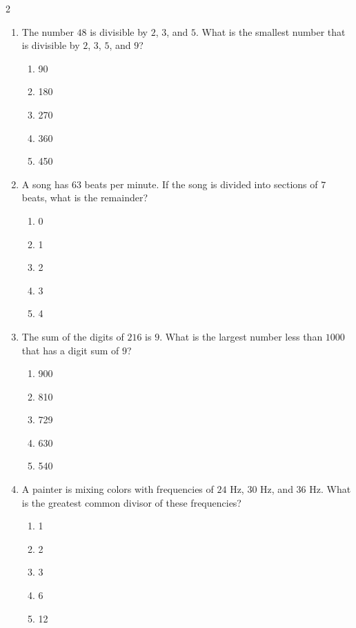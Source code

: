 \documentclass[10pt]{article}
\begin{document}
\begin{multicols}{2}
\begin{enumerate}[label=\textbf{Q\arabic*.}, leftmargin=*, itemsep=6pt, parsep=0pt]
  \item \small The number $48$ is divisible by $2$, $3$, and $5$. What is the smallest number that is divisible by $2$, $3$, $5$, and $9$?
  \begin{enumerate}[label=(\Alph*), leftmargin=0.6cm, nosep, itemsep=2pt]
    \item 90
    \item 180
    \item 270
    \item 360
    \item 450
  \end{enumerate}

  \item \small A song has $63$ beats per minute. If the song is divided into sections of $7$ beats, what is the remainder?
  \begin{enumerate}[label=(\Alph*), leftmargin=0.6cm, nosep, itemsep=2pt]
    \item 0
    \item 1
    \item 2
    \item 3
    \item 4
  \end{enumerate}

  \item \small The sum of the digits of $216$ is $9$. What is the largest number less than $1000$ that has a digit sum of $9$?
  \begin{enumerate}[label=(\Alph*), leftmargin=0.6cm, nosep, itemsep=2pt]
    \item 900
    \item 810
    \item 729
    \item 630
    \item 540
  \end{enumerate}

  \item \small A painter is mixing colors with frequencies of $24$ Hz, $30$ Hz, and $36$ Hz. What is the greatest common divisor of these frequencies?
  \begin{enumerate}[label=(\Alph*), leftmargin=0.6cm, nosep, itemsep=2pt]
    \item 1
    \item 2
    \item 3
    \item 6
    \item 12
  \end{enumerate}


\end{enumerate}
\end{multicols}
\end{document}
